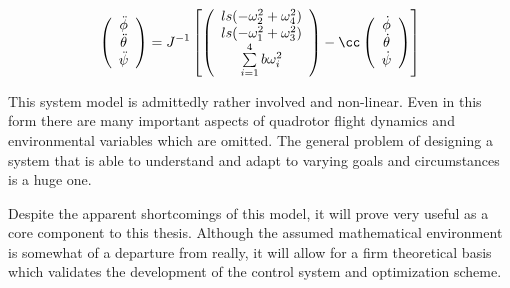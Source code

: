 \begin{equation}
    \left(
        \begin{array}{c}
           \ddot{\phi}\\
           \ddot{\theta}\\
           \ddot{\psi}\\
        \end{array}
    \right) = J^{-1}
    \left[ \left(
        \begin{array}{c}
            l s (-\omega_2^2 + \omega_4^2)\\
            l s (-\omega_1^2 + \omega_3^2)\\ 
            \sum \limits_{i=1}^4 b \omega_i^2\\
        \end{array}
    \right) -
    \cc
    \left(
        \begin{array}{c}
           \dot{\phi}\\
           \dot{\theta}\\
           \dot{\psi}\\
        \end{array}
    \right)
    \right]
\end{equation}


This system model is admittedly rather involved and non-linear. Even in this form there are many important aspects of quadrotor flight dynamics and environmental variables which are omitted. The general problem of designing a system that is able to understand and adapt to varying goals and circumstances is a huge one. 

Despite the apparent shortcomings of this model, it will prove very useful as a core component to this thesis. Although the assumed mathematical environment is somewhat of a departure from really, it will allow for a firm theoretical basis which validates the development of the control system and optimization scheme.




